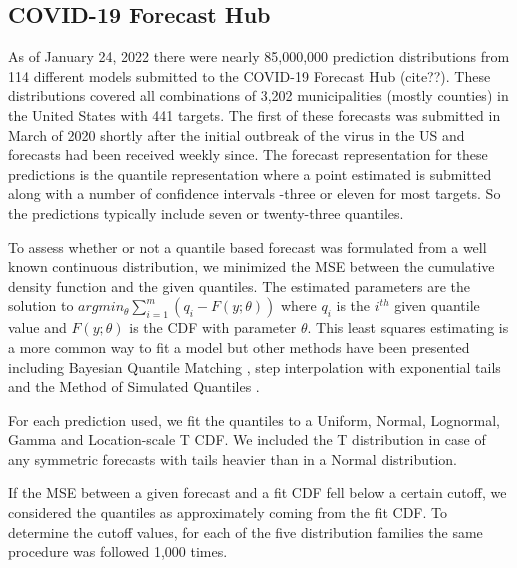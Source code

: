 \documentclass{article}\usepackage[]{graphicx}\usepackage[]{color}
\begin{document}
\subsection{COVID-19 Forecast Hub}

As of January 24, 2022 there were nearly 85,000,000 prediction distributions 
from 114 different models submitted to the COVID-19 Forecast Hub (cite??). These 
distributions covered all combinations of 3,202 municipalities (mostly counties) 
in the United States with 441 targets. The first of these forecasts was 
submitted in March of 2020 shortly after the initial outbreak of the virus in 
the US and forecasts had been received weekly since. The forecast representation
for these predictions is the quantile representation where a point estimated is
submitted along with a number of confidence intervals -three or eleven for most
targets. So the predictions typically include seven or twenty-three quantiles.

To assess whether or not a quantile based forecast was formulated from a well
known continuous distribution, we minimized the MSE between the cumulative
density function and the given quantiles. The estimated parameters are the 
solution to $argmin_{\theta} \sum_{i=1}^m (q_i - F(y; \theta))$ where $q_i$ is
the $i^{th}$ given quantile value and $F(y; \theta)$ is the CDF with parameter
$\theta$. This least squares estimating is a more common way to fit a model but
other methods have been presented including Bayesian Quantile Matching
\cite{nirwan2020bayesian}, step interpolation with exponential tails 
\cite{quinonero2005evaluating}
and the Method of Simulated Quantiles 
\cite{dominicy2013method}.

For each prediction used, we fit the quantiles to a Uniform, Normal, Lognormal,
Gamma and Location-scale T CDF. We included the T distribution in case of any
symmetric forecasts with tails heavier than in a Normal distribution.

If the MSE between a given forecast and a fit CDF fell below a certain cutoff,
we considered the quantiles as approximately coming from the fit CDF. To
determine the cutoff values, for each of the five distribution families the same
procedure was followed 1,000 times. 
\end{document}
